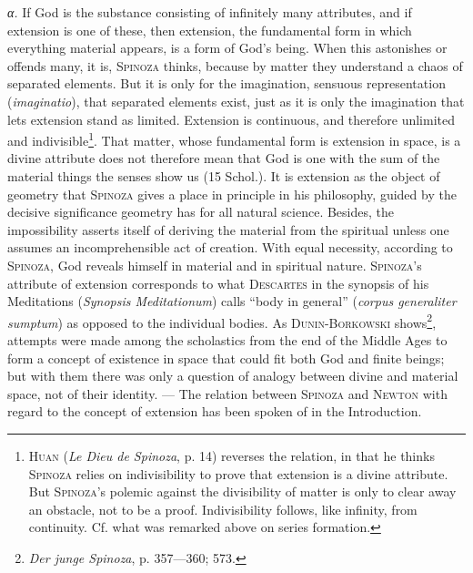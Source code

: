 \documentclass[12pt]{article}
\newcommand{\opage}[1]{\marginnote{\footnotesize\textit{[#1]}}}
\begin{document}
\textit{α.} If God is the substance consisting of infinitely many attributes, and if
extension is one of these, then extension, the fundamental form in which everything
material appears, is a form of God's being. When this astonishes or offends many, it is,
\textsc{Spinoza} thinks, because by matter they understand a chaos of separated
elements. But it is only for the imagination, sensuous representation
(\textit{imaginatio}), that separated elements exist, just as it is only the
imagination that lets extension stand as limited. Extension is continuous, and
therefore unlimited and indivisible\footnote{\textsc{Huan} (\textit{Le Dieu de
Spinoza}, p. 14) reverses the relation, in that he thinks \textsc{Spinoza} relies on
indivisibility to prove that extension is a divine attribute. But \textsc{Spinoza}'s
polemic against the divisibility of matter is only to clear away an obstacle, not to be
a proof. Indivisibility follows, like infinity, from continuity. Cf. what was remarked
above on series formation.}. That matter, whose fundamental form is extension in space,
is a divine attribute does not therefore mean that God is one with the sum of the
material things the senses show us (15 Schol.). It is extension as the object of
geometry that \textsc{Spinoza} gives a place in principle in his philosophy, guided by
the decisive significance geometry has for all natural science. Besides, the
impossibility asserts itself \opage{25}of deriving the material from the spiritual
unless one assumes an incomprehensible act of creation. With equal necessity, according
to \textsc{Spinoza}, God reveals himself in material and in spiritual nature.
\textsc{Spinoza}'s attribute of extension corresponds to what \textsc{Descartes} in the
synopsis of his Meditations (\textit{Synopsis Meditationum}) calls ``body in general''
(\textit{corpus generaliter sumptum}) as opposed to the individual bodies. As
\textsc{Dunin-Borkowski} shows\footnote{\textit{Der junge Spinoza}, p. 357---360;
573.}, attempts were made among the scholastics from the end of the Middle Ages to form
a concept of existence in space that could fit both God and finite beings; but with
them there was only a question of analogy between divine and material space, not of
their identity. --- The relation between \textsc{Spinoza} and \textsc{Newton} with
regard to the concept of extension has been spoken of in the Introduction.
\end{document}

